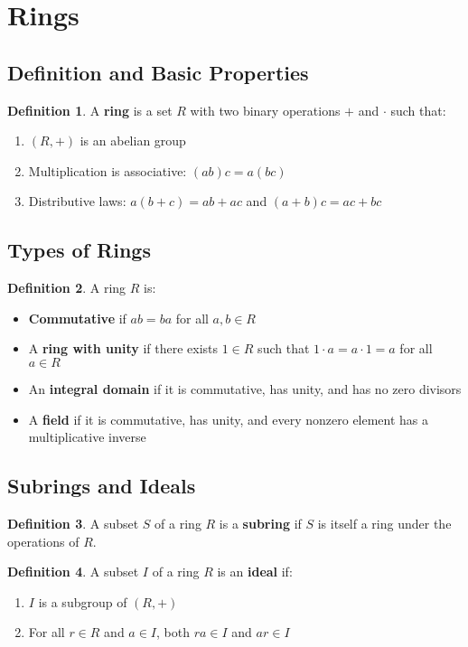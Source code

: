 \documentclass[11pt]{article}
\theoremstyle{definition}
\newtheorem{definition}{Definition}[section]
\begin{document}
\section{Rings}

\subsection{Definition and Basic Properties}
\begin{definition}
A \textbf{ring} is a set $R$ with two binary operations $+$ and $\cdot$ such that:
\begin{enumerate}
    \item $(R, +)$ is an abelian group
    \item Multiplication is associative: $(ab)c = a(bc)$
    \item Distributive laws: $a(b + c) = ab + ac$ and $(a + b)c = ac + bc$
\end{enumerate}
\end{definition}

\subsection{Types of Rings}
\begin{definition}
A ring $R$ is:
\begin{itemize}
    \item \textbf{Commutative} if $ab = ba$ for all $a, b \in R$
    \item A \textbf{ring with unity} if there exists $1 \in R$ such that $1 \cdot a = a \cdot 1 = a$ for all $a \in R$
    \item An \textbf{integral domain} if it is commutative, has unity, and has no zero divisors
    \item A \textbf{field} if it is commutative, has unity, and every nonzero element has a multiplicative inverse
\end{itemize}
\end{definition}

\subsection{Subrings and Ideals}
\begin{definition}
A subset $S$ of a ring $R$ is a \textbf{subring} if $S$ is itself a ring under the operations of $R$.
\end{definition}

\begin{definition}
A subset $I$ of a ring $R$ is an \textbf{ideal} if:
\begin{enumerate}
    \item $I$ is a subgroup of $(R, +)$
    \item For all $r \in R$ and $a \in I$, both $ra \in I$ and $ar \in I$
\end{enumerate}
\end{definition}
\end{document}

